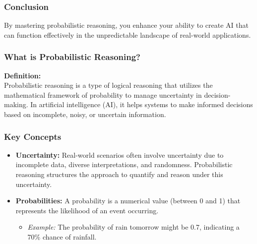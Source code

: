 \documentclass[aspectratio=169]{beamer}
\begin{document}
\begin{frame}[fragile]
    \frametitle{Conclusion}
    By mastering probabilistic reasoning, you enhance your ability to create AI that can function effectively in the unpredictable landscape of real-world applications.
\end{frame}

\begin{frame}[fragile]
    \frametitle{What is Probabilistic Reasoning?}
    \textbf{Definition:}\\
    Probabilistic reasoning is a type of logical reasoning that utilizes the mathematical framework of probability to manage uncertainty in decision-making. In artificial intelligence (AI), it helps systems to make informed decisions based on incomplete, noisy, or uncertain information.
\end{frame}

\begin{frame}[fragile]
    \frametitle{Key Concepts}
    \begin{itemize}
        \item \textbf{Uncertainty:} Real-world scenarios often involve uncertainty due to incomplete data, diverse interpretations, and randomness. Probabilistic reasoning structures the approach to quantify and reason under this uncertainty.
        
        \item \textbf{Probabilities:} A probability is a numerical value (between 0 and 1) that represents the likelihood of an event occurring.
        \begin{itemize}
            \item \textit{Example:} The probability of rain tomorrow might be 0.7, indicating a 70\% chance of rainfall.
        \end{itemize}
    \end{itemize}
\end{frame}
\end{document}
